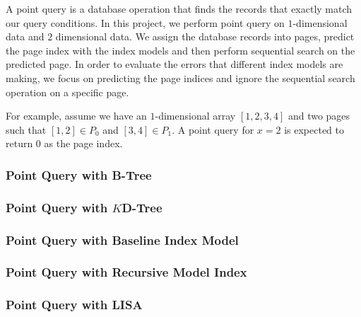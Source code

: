 A point query is a database operation that finds the records that exactly match our query conditions. In this project, we perform point query on $1$-dimensional data and $2$ dimensional data. We assign the database records into pages, predict the page index with the index models and then perform sequential search on the predicted page. In order to evaluate the errors that different index models are making, we focus on predicting the page indices and ignore the sequential search operation on a specific page. 

\begin{mscexample}
For example, assume we have an $1$-dimensional array $[1,2,3,4]$ and two pages such that $[1,2]\in P_0$ and $[3,4]\in P_1$. A point query for $x=2$ is expected to return 0 as the page index.
\end{mscexample}

\subsubsection{Point Query with B-Tree}



\subsubsection{Point Query with $K$D-Tree}



\subsubsection{Point Query with Baseline Index Model}



\subsubsection{Point Query with Recursive Model Index}



\subsubsection{Point Query with LISA}


